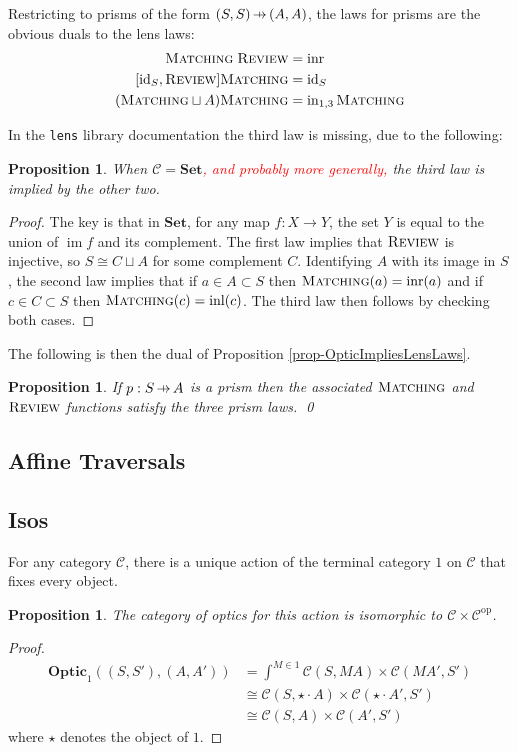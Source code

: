 \documentclass[11pt,a4paper]{article}
\theoremstyle{plain}
\newtheorem{proposition}[theorem]{Proposition}
\theoremstyle{definition}
\newcommand{\C}{\mathscr{C}}
\newcommand{\Set}{\mathbf{Set}}
\newcommand{\Optic}{\mathbf{Optic}}
\newcommand{\id}{\mathrm{id}}
\newcommand{\op}{\mathrm{op}}
\newcommand{\inl}{\mathrm{inl}}
\newcommand{\inr}{\mathrm{inr}}
\DeclareMathOperator{\im}{im}
\newcommand{\freview}{\textsc{Review}}
\newcommand{\fmatching}{\textsc{Matching}}
\newcommand{\hto}{\ensuremath{\,\mathaccent\shortmid\rightarrow\,}}
\newcommand{\todo}[1]{\textcolor{red}{\small #1}}
\begin{document}
Restricting to prisms of the form $(S, S) \hto (A, A)$, the laws for prisms are the obvious duals to the lens laws: 
\begin{align*}
\fmatching \; \freview &= \inr \\
[\id_S, \freview] \fmatching &= \id_S \\
(\fmatching \sqcup A) \fmatching &= \mathrm{in}_{1,3} \, \fmatching
\end{align*}

In the \texttt{lens} library documentation the third law is missing, due to the following:

\begin{proposition}
When $\C = \Set$\todo{, and probably more generally,} the third law is implied by the other two.
\end{proposition}
\begin{proof}
The key is that in $\Set$, for any map $f : X \to Y$, the set $Y$ is equal to the union of $\im f$ and its complement. The first law implies that $\freview$ is injective, so $S \cong C \sqcup A$ for some complement $C$. Identifying $A$ with its image in $S$, the second law implies that if $a\in A \subset S$ then $\fmatching(a) = \inr(a)$ and if $c\in C \subset S$ then $\fmatching(c) = \inl(c)$. The third law then follows by checking both cases.
\end{proof}

The following is then the dual of Proposition \ref{prop-OpticImpliesLensLaws}.
\begin{proposition}
\label{prop-OpticImpliesPrismLaws}
If $p : S \hto A$ is a prism then the associated $\fmatching$ and $\freview$ functions satisfy the three prism laws. \qed
\end{proposition}

\subsection{Affine Traversals}


\subsection{Isos}

For any category $\C$, there is a unique action of the terminal category $1$ on $\C$ that fixes every object. 

\begin{proposition}
The category of optics for this action is isomorphic to $\C \times \C^\op$.
\end{proposition}
\begin{proof}
\begin{align*}
\Optic_1((S, S'), (A, A')) &= \int^{M \in 1} \C(S, MA) \times \C(MA', S') \\
&\cong \C(S, \star \cdot A) \times \C(\star \cdot A', S') \\
&\cong \C(S, A) \times \C(A', S')
\end{align*}
where $\star$ denotes the object of $1$.
\end{proof}
\end{document}
